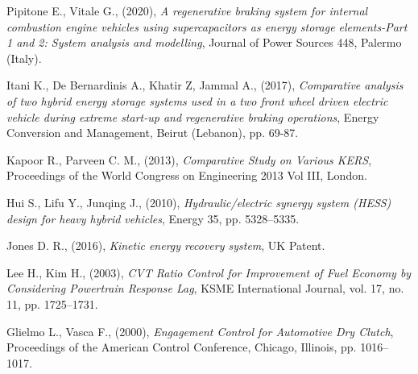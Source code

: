 \documentclass[11pt]{article}
\begin{document}
\begin{thebibliography}{60}
	Pipitone E., Vitale G., (2020), \textit{A regenerative braking system for internal combustion engine vehicles using supercapacitors as energy storage 		elements-Part 1 and 2: System analysis and modelling}, Journal of Power Sources 448, Palermo (Italy).     	
	
	Itani K., De Bernardinis A., Khatir Z, Jammal A., (2017),  							\textit{Comparative analysis of two hybrid energy storage systems used in a 		two front wheel driven electric vehicle during extreme start-up and 				regenerative braking operations},  Energy Conversion and Management, Beirut 		(Lebanon), pp. 69-87.
	
	Kapoor R., Parveen C. M., (2013), \textit{Comparative Study on Various KERS},   	Proceedings of the World Congress on Engineering 2013 Vol III, London.
	
	Hui S., Lifu Y., Junqing J., (2010), \textit{Hydraulic/electric synergy   	 	    system (HESS) design for heavy hybrid vehicles}, Energy 35, pp. 5328--5335.
	
	Jones D. R., (2016), \textit{Kinetic energy recovery system},
	UK Patent.  
	
	Lee H., Kim H., (2003), \textit{CVT Ratio Control for Improvement of Fuel Economy
	by Considering Powertrain Response Lag}, KSME International Journal, vol. 17, no. 11, pp. 1725--1731. 
	
	Glielmo L., Vasca F., (2000), \textit{Engagement Control for Automotive Dry Clutch}, Proceedings of the American Control Conference, Chicago, Illinois, pp. 1016--1017.
\end{thebibliography}
\end{document}
